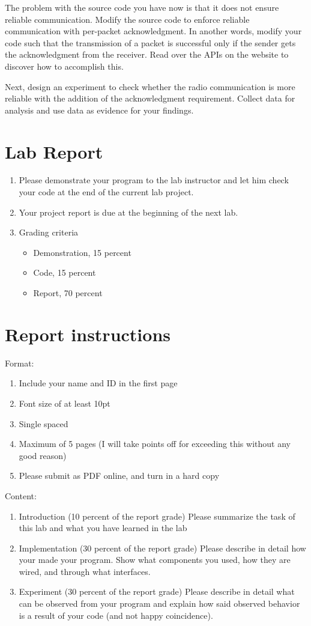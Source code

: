 \documentclass[letterpaper,12pt]{article}
\begin{document}
    The problem with the source code you have now is that it does not ensure reliable communication.
    Modify the source code to enforce reliable communication with per-packet acknowledgment.
    In another words, modify your code such that the transmission of a packet is successful
    only if the sender gets the acknowledgment from the receiver. Read over the APIs on the website to
    discover how to accomplish this.

    Next, design an experiment to check whether the radio communication is more reliable with
    the addition of the acknowledgment requirement. Collect data for analysis and use data
    as evidence for your findings.
\section*{Lab Report}
\begin{enumerate}
   \item Please demonstrate your program to the lab instructor and let him check your code at the end of the current lab project.
   \item Your project report is due at the beginning of the next lab.
   \item Grading criteria
      \begin{itemize}
         \item Demonstration, 15 percent
         \item Code, 15 percent
         \item Report, 70 percent
      \end{itemize}
\end{enumerate}
\section*{Report instructions}
Format:
\begin{enumerate}
   \item Include your name and ID in the first page
   \item Font size of at least 10pt
   \item Single spaced
   \item Maximum of 5 pages (I will take points off for exceeding this without any good reason)
   \item Please submit as PDF online, and turn in a hard copy
\end{enumerate}
Content:
\begin{enumerate}
   \item Introduction (10 percent of the report grade) Please summarize the task of this lab and what you have learned in the lab
   \item Implementation (30 percent of the report grade) Please describe in detail how your made your program. Show what components you used, how they are wired, and through what interfaces.
   \item Experiment (30 percent of the report grade) Please describe in detail what can be observed from your program and explain how said observed behavior is a result of your code (and not happy coincidence).
\end{enumerate}
\end{document}
